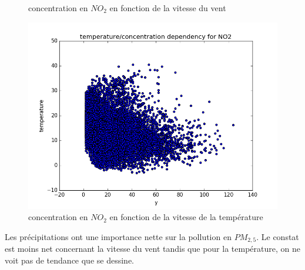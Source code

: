 \begin{figure}[H]
  \caption{concentration en $NO_2$ en fonction de la vitesse du vent}
	\endminipage\hfill
	\includegraphics[width=\linewidth]{images/NO2_temp_y.png}
  \caption{concentration en $NO_2$ en fonction de la vitesse de la température}
	\endminipage\hfill
\end{figure}
Les précipitations ont une importance nette sur la pollution en $PM_{2,5}$.
Le constat est moins net concernant la vitesse du vent tandis que pour la température, on ne voit pas de tendance que se dessine.

